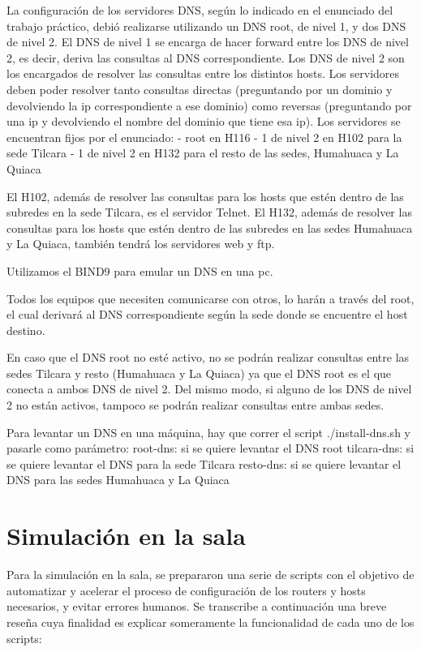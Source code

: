 \documentclass[12pt,titlepage]{article}
\begin{document}
La configuraci\'on de los servidores DNS, seg\'un lo indicado en el enunciado del trabajo pr\'actico, debi\'o realizarse utilizando un DNS root, de nivel 1, y dos DNS de nivel 2. 
El DNS de nivel 1 se encarga de hacer forward entre los DNS de nivel 2, es decir, deriva las consultas al DNS correspondiente.
Los DNS de nivel 2 son los encargados de resolver las consultas entre los distintos hosts.
Los servidores deben poder resolver tanto consultas directas (preguntando por un dominio y devolviendo la ip correspondiente a ese dominio) como reversas (preguntando por una ip y devolviendo el nombre del dominio que tiene esa ip).
Los servidores se encuentran fijos por el enunciado:
	- root en H116
	- 1 de nivel 2 en H102 para la sede Tilcara
	- 1 de nivel 2 en H132 para el resto de las sedes, Humahuaca y La Quiaca

El H102, adem\'as de resolver las consultas para los hosts que est\'en dentro de las subredes en la sede Tilcara, es el servidor Telnet.
El H132, adem\'as de resolver las consultas para los hosts que est\'en dentro de las subredes en las sedes Humahuaca y La Quiaca, tambi\'en tendr\'a los servidores web y ftp.

Utilizamos el BIND9 para emular un DNS en una pc.

Todos los equipos que necesiten comunicarse con otros, lo har\'an a trav\'es del root, el cual derivar\'a al DNS correspondiente seg\'un la sede donde se encuentre el host destino.

En caso que el DNS root no est\'e activo, no se podr\'an realizar consultas entre las sedes Tilcara y resto (Humahuaca y La Quiaca) ya que el DNS root es el que conecta a ambos DNS de nivel 2.
Del mismo modo, si alguno de los DNS de nivel 2 no est\'an activos, tampoco se podr\'an realizar consultas entre ambas sedes.

Para levantar un DNS en una m\'aquina, hay que correr el script ./install-dns.sh y pasarle como par\'ametro:
	root-dns: si se quiere levantar el DNS root
	tilcara-dns: si se quiere levantar el DNS para la sede Tilcara
	resto-dns: si se quiere levantar el DNS para las sedes Humahuaca y La Quiaca

\section{Simulación en la sala}
Para la simulaci\'on en la sala, se prepararon una serie de scripts con el objetivo de automatizar y acelerar el proceso de configuraci\'on de los routers y hosts necesarios, y evitar errores humanos.
Se transcribe a continuaci\'on una breve reseña cuya finalidad es explicar someramente la funcionalidad de cada uno de los scripts:
\end{document}
